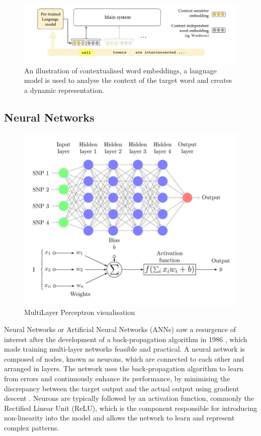 
\begin{figure}[htbp]
    \centering
    \includegraphics[width=0.9\linewidth]{images/contextualised_word_embeddings.png}
    \caption{An illustration of contextualised word embeddings, a language model is used to analyse the context of the target word and creates a dynamic representation. \cite{camacho-collados-2020-embeddings}}
    \label{fig:contextualised-word-embeddings}
\end{figure}


\subsection{Neural Networks}

\begin{figure}[htbp]
    \centering
    \includegraphics[width=0.9\linewidth]{images/mlp.png}
    \caption{MultiLayer Perceptron visualisation \cite{perez-enciso-2019-guide}}
    \label{fig:mlp}
\end{figure}

Neural Networks or Artificial Neural Networks (ANNs) saw a resurgence of interest after the development of a back-propagation algorithm in 1986 \cite{rumelhart-1986-ann}, which made training multi-layer networks feasible and practical. A neural network is composed of nodes, known as neurons, which are connected to each other and arranged in layers. The network uses the back-propagation algorithm to learn from errors and continuously enhance its performance, by minimising the discrepancy between the target output and the actual output using gradient descent \cite{popescue-2009-mlp}. Neurons are typically followed by an activation function, commonly the Rectified Linear Unit (ReLU), which is the component responsible for introducing non-linearity into the model and allows the network to learn and represent complex patterns.

